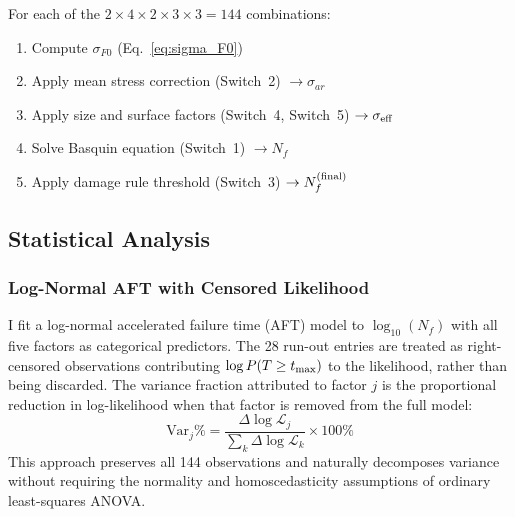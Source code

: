 \documentclass[12pt,a4paper]{article}
\begin{document}
For each of the $2\times4\times2\times3\times3 = 144$ combinations:
\begin{enumerate}
  \item Compute $\sigma_{F0}$ (Eq.~\ref{eq:sigma_F0})
  \item Apply mean stress correction (Switch~2) $\rightarrow \sigma_{ar}$
  \item Apply size and surface factors (Switch~4, Switch~5)
        $\rightarrow \sigma_{\rm eff}$
  \item Solve Basquin equation (Switch~1) $\rightarrow N_f$
  \item Apply damage rule threshold (Switch~3)
        $\rightarrow N_f^{\rm (final)}$
\end{enumerate}

\subsection{Statistical Analysis}

\subsubsection{Log-Normal AFT with Censored Likelihood}

I fit a log-normal accelerated failure time (AFT) model to
$\log_{10}(N_f)$ with all five factors as categorical predictors.
The 28 run-out entries are treated as right-censored observations
contributing $\log P(T \geq t_{\rm max})$ to the likelihood, rather
than being discarded. The variance fraction attributed to factor
$j$ is the proportional reduction in log-likelihood when that factor
is removed from the full model:
\begin{equation}
\text{Var}_j\% =
\frac{\Delta\log\mathcal{L}_j}{\sum_k \Delta\log\mathcal{L}_k}
\times 100\%
\label{eq:lr_var}
\end{equation}
This approach
preserves all 144 observations and naturally decomposes variance
without requiring the normality and homoscedasticity assumptions of
ordinary least-squares ANOVA.
\end{document}
